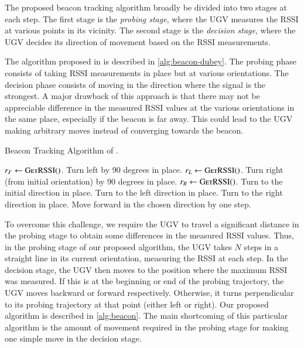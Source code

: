\documentclass[conference]{IEEEtran}
\begin{document}
The proposed beacon tracking algorithm broadly be divided into two stages at
each step. The first stage is the \emph{probing stage}, where the UGV measures
the RSSI at various points in its vicinity. The second stage is the
\emph{decision stage}, where the UGV decides its direction of movement based on
the RSSI measurements.

The algorithm proposed in
\cite{dubeyNavigationCommunicationUGV2022} is described in
\autoref{alg:beacon-dubey}. The probing phase consists of taking RSSI
measurements in place but at various orientations. The decision phase consists
of moving in the direction where the signal is the strongest. A major drawback
of this approach is that there may not be appreciable difference in the measured
RSSI values at the various orientations in the same place, especially if the
beacon is far away. This could lead to the UGV making arbitrary moves instead of
converging towards the beacon.

\begin{algorithm}[H]
    \caption{Beacon Tracking Algorithm of \cite{dubeyNavigationCommunicationUGV2022}.}
    \label{alg:beacon-dubey}
    \begin{algorithmic}[1]
            \State \(r_F \gets \textsc{GetRSSI()}\).
            \State Turn left by 90 degrees in place.
            \State \(r_L \gets \textsc{GetRSSI()}\).
            \State Turn right (from initial orientation) by 90 degrees in place.
            \State \(r_R \gets \textsc{GetRSSI()}\).
                \State Turn to the initial direction in place.
                \State Turn to the left direction in place.
                \State Turn to the right direction in place.
            \EndIf
            \State Move forward in the chosen direction by one step.
        \EndWhile
    \end{algorithmic}
\end{algorithm}

To overcome this challenge, we require the UGV to travel a significant distance
in the probing stage to obtain some differences in the measured RSSI values.
Thus, in the probing stage of our proposed algorithm, the UGV takes \(N\) steps
in a straight line in its current orientation, measuring the RSSI at each step.
In the decision stage, the UGV then moves to the position where the maximum RSSI
was measured. If this is at the beginning or end of the probing trajectory, the
UGV moves backward or forward respectively. Otherwise, it turns perpendicular to
its probing trajectory at that point (either left or right). Our proposed
algorithm is described in \autoref{alg:beacon}. The main shortcoming of this
particular algorithm is the amount of movement required in the probing stage for
making one simple move in the decision stage.
\end{document}
